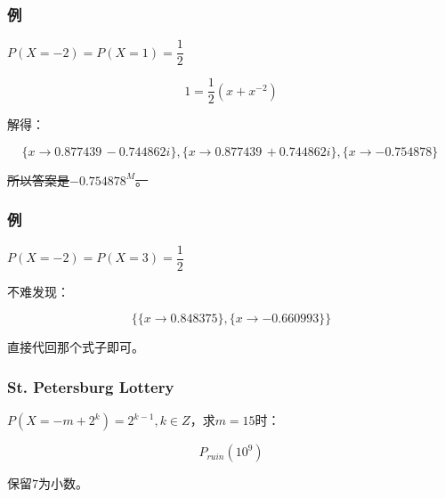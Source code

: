 \documentclass[10pt]{beamer}
\begin{document}
	\begin{frame}
		\frametitle{例}
	
		$P(X=-2)=P(X=1)=\dfrac 12$


		$$
		1=\dfrac{1}{2}(x+x^{-2})
		$$

		解得：

		$$
		\{x\to 0.877439\, -0.744862 i\},\{x\to 0.877439\, +0.744862 i\},\{x\to -0.754878\}\
		$$

		\sout{所以答案是$-0.754878^M$。}

	\end{frame}
	\begin{frame}
		\frametitle{例}
	
		$P(X=-2)=P(X=3)=\dfrac 12$

		\onslide<2->

		不难发现：

		$$
		\{\{x\to 0.848375\},\{x\to -0.660993\}\}
		$$

		直接代回那个式子即可。
	
	\end{frame}
	\begin{frame}
		\frametitle{St. Petersburg Lottery}
	
		$P(X=-m+2^k)=2^{k-1},k\in Z$，求$m=15$时：

		$$
		P_{ruin}(10^9)
		$$

		保留$7$为小数。
	
	\end{frame}
\end{document}
